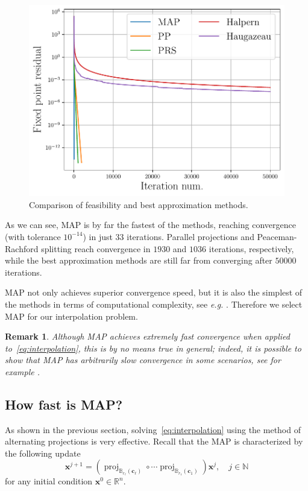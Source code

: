 \documentclass{article}
\DeclareMathOperator{\proj}{proj}
\newtheorem{remark}[theorem]{Remark}
\newcommand{\N}{\mathbb{N}}
\newcommand{\R}{\mathbb{R}}
\newcommand{\x}{\mathbold{x}}
\newcommand{\ball}[2]{\mathbb{B}_{#2}(#1)}
\newcommand{\cv}{\mathbold{c}}
\begin{document}
\begin{figure}[!ht]
\centering
\includegraphics[width = 0.9\columnwidth]{Figures/comparison_projection_methods}
\caption{Comparison of feasibility and best approximation methods.}
\label{fig:projection_methods}
\end{figure}

As we can see, MAP is by far the fastest of the methods, reaching convergence (with tolerance $10^{-14}$) in just $33$ iterations. Parallel projections and Peaceman-Rachford splitting reach convergence in $1930$ and $1036$ iterations, respectively, while the best approximation methods are still far from converging after $50000$ iterations.

MAP not only achieves superior convergence speed, but it is also the simplest of the methods in terms of computational complexity, see \emph{e.g.} \cite{reich_projection_2015}. Therefore we select MAP for our interpolation problem. 

\begin{remark}
Although MAP achieves extremely fast convergence when applied to~\eqref{eq:interpolation}, this is by no means true in general; indeed, it is possible to show that MAP has \emph{arbitrarily slow} convergence in some scenarios, see for example \cite{hundal_alternating_2004,bauschke_characterizing_2009}.
\end{remark}

\subsection{How fast is MAP?}
As shown in the previous section, solving~\eqref{eq:interpolation} using the method of alternating projections is very effective. Recall that the MAP is characterized by the following update
\begin{equation}\label{eq:alternating_projections}
	\x^{j+1} = (\proj_{\ball{\cv_{\ell}}{r_{\ell}}} \circ \cdots \proj_{\ball{\cv_1}{r_1}}) \x^j, \quad j \in \N
\end{equation}
for any initial condition $\x^0 \in \R^n$.
\end{document}
